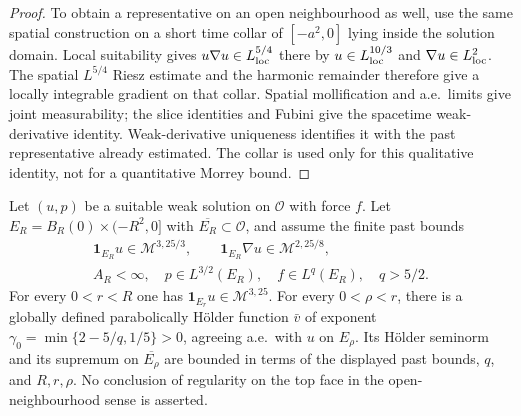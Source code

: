 \documentclass[11pt,reqno]{amsart}
\begin{document}
\begin{proof}
To obtain a representative on an open neighbourhood as well, use the
same spatial construction on a short time collar of $[-a^2,0]$ lying
inside the solution domain. Local suitability gives
$u\nabla u\in L^{5/4}_{\rm loc}$ there by
$u\in L^{10/3}_{\rm loc}$ and $\nabla u\in L^2_{\rm loc}$.
The spatial $L^{5/4}$ Riesz estimate and the harmonic remainder therefore
give a locally integrable gradient on that collar. Spatial mollification
and a.e.\ limits give joint measurability; the slice identities and
Fubini give the spacetime weak-derivative identity. Weak-derivative
uniqueness identifies it with the past representative already estimated.
The collar is used only for this qualitative identity, not for a
quantitative Morrey bound.
\end{proof}

\begin{proposition}\label{prop:past-bootstrap}
Let $(u,p)$ be a suitable weak solution on $\mathcal O$ with force $f$.
Let $E_R=B_R(0)\times(-R^2,0]$ with
$\overline{E_R}\subset\mathcal O$, and assume the finite past bounds
\[\begin{gathered}
 \mathbf1_{E_R}u\in\mathcal M^{3,25/3},\qquad
 \mathbf1_{E_R}\nabla u\in\mathcal M^{2,25/8},\\
 A_R<\infty,\quad p\in L^{3/2}(E_R),\quad f\in L^q(E_R),\quad q>5/2.
\end{gathered}\]
For every $0<r<R$ one has
$\mathbf1_{E_r}u\in\mathcal M^{3,25}$.
For every $0<\rho<r$, there is a globally defined parabolically
H\"older function $\bar v$ of exponent
$\gamma_0=\min\{2-5/q,1/5\}>0$, agreeing a.e.\ with $u$ on $E_\rho$.
Its H\"older seminorm and its supremum on $\overline{E_\rho}$ are
bounded in terms of the displayed past bounds, $q$, and $R,r,\rho$.
No conclusion of regularity on the top face in the open-neighbourhood
sense is asserted.
\end{proposition}
\end{document}
